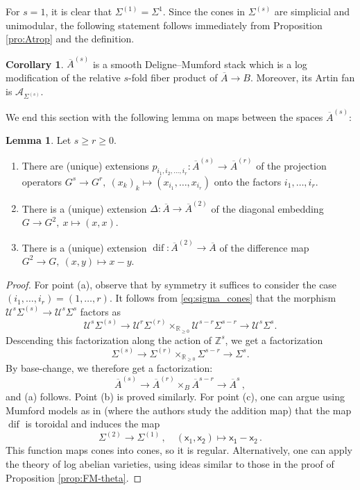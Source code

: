 \documentclass[11pt]{article}
\def\ZZ{\mathbb{Z}}
\newcommand{\RR}{\mathbb{R}}
\newcommand{\barA}{\overline{A}}
\newcommand{\diff}{\operatorname{dif}}
\theoremstyle{definition}
\newtheorem{corollary}[definition]{Corollary}
\newtheorem{lemma}[definition]{Lemma}
\begin{document}
For $s=1$, it is clear that $\Sigma^{(1)}=\Sigma^1$.
Since the cones in $\Sigma^{(s)}$ are simplicial and unimodular, the following statement follows immediately from Proposition \ref{pro:Atrop} and the definition.

\begin{corollary}\label{cor:As}
    $\barA^{(s)}$ is a smooth Deligne--Mumford stack which is a log modification of the relative $s$-fold fiber product of $\barA \to B$. Moreover, its Artin fan is $\mathcal A_{\Sigma^{(s)}}$.
\end{corollary}



We end this section with the following lemma on maps between the spaces $\barA^{(s)}$:

\begin{lemma}\label{lem:maps_regular}
	Let $s\ge r\ge 0$.
\begin{enumerate}[label = (\alph*)]
	\item There are (unique) extensions $p_{i_1,i_2,\dots,i_r}:\barA^{(s)}\to \barA^{(r)}$ of the projection operators $G^{s}\to G^{r},\ (x_k)_k\mapsto (x_{i_1},\dots,x_{i_r})$
	onto the factors $i_1,\dots,i_r$.
	\item There is a (unique) extension $\Delta:\barA\to \barA^{(2)}$ of the diagonal embedding $G\to G^{2},\ x\mapsto (x,x)$.
	\item There is a (unique) extension $\diff:\barA^{(2)}\to \barA$ of the difference map $G^{2}\to G,\ (x,y)\mapsto x-y$.
\end{enumerate}
\end{lemma}

\begin{proof}
	For point (a), observe that by symmetry it suffices to consider the case $(i_1,\dots,i_r)=(1,\dots,r)$. It follows from \eqref{eq:sigma_cones} that the morphism $\mathcal U^s\Sigma^{(s)}\to\mathcal U^s\Sigma^s$ factors as
	$$
	\mathcal U^s\Sigma^{(s)}\to \mathcal U^r\Sigma^{(r)} \times_{\RR_{\ge 0}} \mathcal U^{s-r}\Sigma^{s-r} \to \mathcal U^s\Sigma^s.
	$$
	Descending this factorization along the action of $\ZZ^s$, we get a factorization
	$$
	\Sigma^{(s)}\to \Sigma^{(r)} \times_{\RR_{\ge 0}} \Sigma^{s-r} \to \Sigma^s.
	$$
	By base-change, we therefore get a factorization:
	$$\barA^{(s)}\to \barA^{(r)}\times_B \barA^{s-r}\to \barA^{s}\, ,$$
	and (a) follows. Point (b) is proved similarly. For point (c), one can argue using Mumford models as in \cite{vdgK} (where the authors study the addition map) that the map $\diff$ is toroidal and induces the map
	$$
    \Sigma^{(2)} \to \Sigma^{(1)}\, , \quad (\mathsf{x}_1, \mathsf{x_2}) \mapsto \mathsf{x_1}-\mathsf{x}_2\,.
    $$
    This function maps cones into cones, so it is regular. Alternatively, one can apply the theory of log abelian varieties,
    using ideas similar to those in the proof of Proposition \ref{prop:FM-theta}.
\end{proof}
\end{document}
